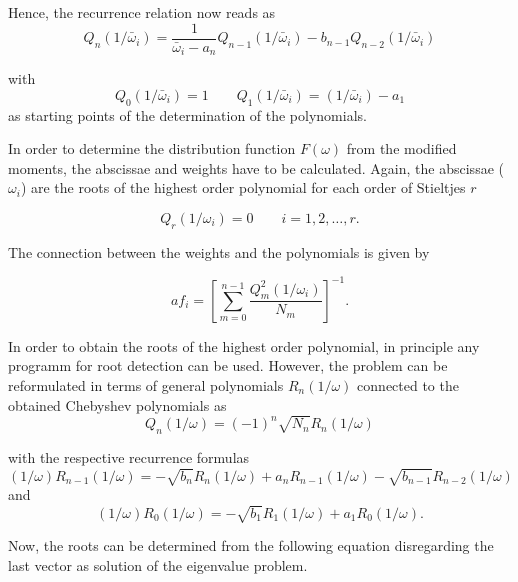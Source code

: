Hence, the recurrence relation now reads as
\begin{equation}
  Q_n(1/\bar{\omega}_i) = \frac{1}{\bar{\omega}_i - a_n} Q_{n-1}(1/\bar{\omega}_i)
                          - b_{n-1} Q_{n-2}(1/\bar{\omega}_i)
\end{equation}

with
\begin{equation}
  Q_0(1/\bar{\omega}_i) = 1 \quad\quad Q_1(1/\bar{\omega}_i) = (1/\bar{\omega}_i) - a_1
\end{equation}
as starting points of the determination of the polynomials.

In order to determine the
distribution function $F(\omega)$ from the modified moments, the abscissae and
weights have to be calculated.
Again, the abscissae ($\omega_i$) are the roots of the
highest order polynomial
for each order of Stieltjes $r$

\begin{equation}
  Q_r(1/\omega_i) = 0 \quad\quad i = 1,2,\dots ,r .
\end{equation}

The connection between the weights and the polynomials is given by

\begin{equation}a  \label{equation:poly_weights}
  f_i = \left[ \sum\limits_{m=0}^{n-1} \frac{Q_m^2(1/\omega_i)}{N_m} \right]^{-1} .
\end{equation}

In order to obtain the roots of the highest order polynomial, in principle
any programm for root detection can be used. However, the problem can
be reformulated in terms of general polynomials $R_n(1/\omega)$ connected
to the obtained Chebyshev polynomials as
\begin{equation}
  Q_n(1/\omega) = (-1)^n \sqrt{N_n} R_n(1/\omega)
\end{equation}

with the respective recurrence formulas
\begin{equation}
  (1/\omega)R_{n-1}(1/\omega) = - \sqrt{b_n}R_n(1/\omega) + a_nR_{n-1}(1/\omega)
                                - \sqrt{b_{n-1}} R_{n-2}(1/\omega)
\end{equation}
and
\begin{equation}
  (1/\omega)R_0(1/\omega) = - \sqrt{b_1}R_1(1/\omega) + a_1 R_0(1/\omega) .
\end{equation}

Now, the roots can be determined from the following equation disregarding the
last vector as solution of the eigenvalue problem.

